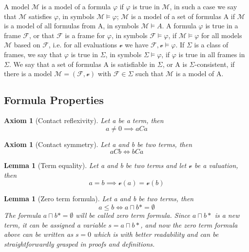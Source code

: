 \documentclass{article}
\newtheorem{lemma}[theorem]{Lemma}
\newtheorem{axiom}[theorem]{Axiom}
\begin{document}
A model $\mathcal{M}$ is a model of a formula $\varphi$ if $\varphi$ is true in $\mathcal{M}$, in such a case we say that $\mathcal{M}$ satisfies $\varphi$, in symbols $\mathcal{M} \models \varphi$;
$\mathcal{M}$ is a model of a set of formulas A if $\mathcal{M}$ is a model of all formulas from A, in symbols $\mathcal{M} \models A$. A formula $\varphi$ is true in a frame $\mathcal{F}$, or that $\mathcal{F}$ is a frame for $\varphi$, in symbols $\mathcal{F} \models \varphi$,
if $\mathcal{M} \models \varphi$ for all models $\mathcal{M}$ based on $\mathcal{F}$, i.e. for all evaluations $\mathscr{v}$ we have $\mathcal{F}, \mathscr{v} \models \varphi$.
If $\Sigma$ is a class of frames, we say that $\varphi$ is true in $\Sigma$, in symbols $\Sigma \models \varphi$, if $\varphi$ is true in all frames in $\Sigma$. We say that a set of 
formulas A is satisfiable in $\Sigma$, or A is $\Sigma$-consistent, if there is a model $\mathcal{M} = (\mathcal{F}, \mathscr{v})$ with $\mathcal{F} \in \Sigma$ such that $\mathcal{M}$
is a model of A.

	\subsection{Formula Properties}
\begin{axiom}[Contact reflexivity]
	Let a be a term, then
	\begin{equation*}
		a \neq 0 \implies aCa
	\end{equation*}
\end{axiom}

\begin{axiom}[Contact symmetry]
	Let a and b be two terms, then
	\begin{equation*}
		aCb \iff bCa
	\end{equation*}
\end{axiom}

\begin{lemma}[Term equality]
	Let a and b be two terms and let $\mathscr{v}$ be a valuation, then
	\begin{equation*}
		a = b \implies \mathscr{v}(a) = \mathscr{v}(b)
	\end{equation*}
\end{lemma}

\begin{lemma}[Zero term formula]
	Let a and b be two terms, then
	\begin{equation*}
		a \le b \iff a \sqcap b* = \emptyset
	\end{equation*}
	The formula $a \sqcap b* = \emptyset$ will be called zero term formula.
	Since $a \sqcap b*$ is a new term, it can be assigned a variable $s = a \sqcap b*$, 
	and now the zero term formula above can be written as $s  = 0$ which is with better readability and 
	can be straightforwardly grasped in proofs and definitions.
\end{lemma}
\end{document}
